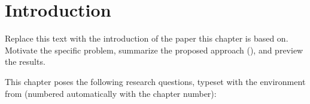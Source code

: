 \section{Introduction}
\label{sec:example-one-introduction}

Replace this text with the introduction of the paper this chapter is
based on.  Motivate the specific problem, summarize the proposed
approach (\toolone), and preview the results.

This chapter poses the following research questions, typeset with the
 environment from  (numbered
automatically with the chapter number):

\begin{rqlist}
\end{rqlist}

